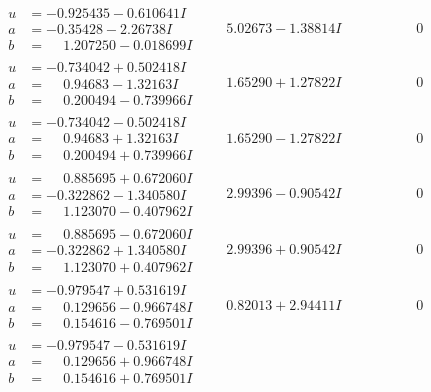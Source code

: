 \documentclass[1p]{elsarticle_modified}
\theoremstyle{definition}
\begin{document}
$$\begin{array}{c|c|c}
\begin{aligned}
u &= -0.925435 - 0.610641 I \\
a &= -0.35428 - 2.26738 I \\
b &= \phantom{-}1.207250 - 0.018699 I\end{aligned}
 & \phantom{-}5.02673 - 1.38814 I & \phantom{-0.000000 } 0 \\ \hline\begin{aligned}
u &= -0.734042 + 0.502418 I \\
a &= \phantom{-}0.94683 - 1.32163 I \\
b &= \phantom{-}0.200494 - 0.739966 I\end{aligned}
 & \phantom{-}1.65290 + 1.27822 I & \phantom{-0.000000 } 0 \\ \hline\begin{aligned}
u &= -0.734042 - 0.502418 I \\
a &= \phantom{-}0.94683 + 1.32163 I \\
b &= \phantom{-}0.200494 + 0.739966 I\end{aligned}
 & \phantom{-}1.65290 - 1.27822 I & \phantom{-0.000000 } 0 \\ \hline\begin{aligned}
u &= \phantom{-}0.885695 + 0.672060 I \\
a &= -0.322862 - 1.340580 I \\
b &= \phantom{-}1.123070 - 0.407962 I\end{aligned}
 & \phantom{-}2.99396 - 0.90542 I & \phantom{-0.000000 } 0 \\ \hline\begin{aligned}
u &= \phantom{-}0.885695 - 0.672060 I \\
a &= -0.322862 + 1.340580 I \\
b &= \phantom{-}1.123070 + 0.407962 I\end{aligned}
 & \phantom{-}2.99396 + 0.90542 I & \phantom{-0.000000 } 0 \\ \hline\begin{aligned}
u &= -0.979547 + 0.531619 I \\
a &= \phantom{-}0.129656 - 0.966748 I \\
b &= \phantom{-}0.154616 - 0.769501 I\end{aligned}
 & \phantom{-}0.82013 + 2.94411 I & \phantom{-0.000000 } 0 \\ \hline\begin{aligned}
u &= -0.979547 - 0.531619 I \\
a &= \phantom{-}0.129656 + 0.966748 I \\
b &= \phantom{-}0.154616 + 0.769501 I\end{aligned}

\end{array}$$
\end{document}
